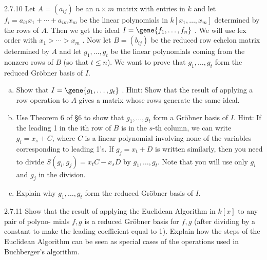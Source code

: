 \documentclass[twoside]{article}
\begin{document}
\begin{ejercicio}{2.7.10}
Let $A = (a_{ij} )$ be an $n × m$ matrix with entries in $k$ and let $f_i = a_{i1} x_1 +\cdots + a_{im} x_m$ be the
linear polynomials in $k[x_1 ,\dots, x_m ]$ determined by the rows of $A$. Then we get the ideal
$I = \gene{f_1 ,\dots , f_n}$ . We will use lex order with $x_1 > \cdots > x_m$ . Now let $B = (b_{ij} )$ be the
reduced row echelon matrix determined by $A$ and let $g_1 ,\dots , g_t$ be the linear polynomials
coming from the nonzero rows of $B$ (so that $t ≤ n$). We want to prove that $g_1 ,\dots , g_t$
form the reduced Gröbner basis of $I$.
\begin{enumerate}[a.]
\item Show that $I =\gene{ g_1 ,\dots , g_t}$ . Hint: Show that the result of applying a row operation to
$A$ gives a matrix whose rows generate the same ideal.
\item Use Theorem 6 of §6 to show that $g_1 , \dots, g_t$ form a Gröbner basis of $I$. Hint: If the
leading 1 in the ith row of $B$ is in the $s$-th column, we can write $g_i = x_s + C$, where $C$
is a linear polynomial involving none of the variables corresponding to leading 1’s.
If $g_j = x_t + D$ is written similarly, then you need to divide $S(g_i , g_j ) = x_t C − x_s D$ by
$g_1 ,\dots , g_t$. Note that you will use only $g_i$ and $g_j$ in the division.
\item Explain why $g_1 ,\dots , g_t$ form the reduced Gröbner basis of $I$.
\end{enumerate}
\end{ejercicio}
\begin{solucion}
\end{solucion}

\newpage

\begin{ejercicio}{2.7.11}
Show that the result of applying the Euclidean Algorithm in $k[x]$ to any pair of polyno-
mials $f , g$ is a reduced Gröbner basis for $f , g$ (after dividing by a constant to make the
leading coefficient equal to 1). Explain how the steps of the Euclidean Algorithm can be
seen as special cases of the operations used in Buchberger’s algorithm.
\end{ejercicio}
\begin{solucion}

\end{solucion}

\newpage
\end{document}
